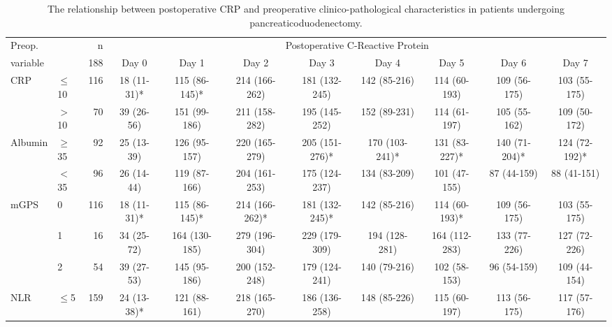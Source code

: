 \begin{sidewaystable}[p]
	\caption{The relationship  between postoperative CRP and preoperative clinico-pathological characteristics in patients undergoing pancreaticoduodenectomy. }
	\label{table:sirs_crp}
	\footnotesize
	\centering
	\renewcommand{\arraystretch}{1.2} %
	\setlength{\tabcolsep}{5pt} %

	\begin{tabular}{|llr | cccccccc|}
		\hline
		Preop.              &          &   n &                                     \multicolumn{8}{c|}{Postoperative C-Reactive Protein}                                      \\
		variable            &          & 188 & Day 0       &     Day 1     &     Day 2      &     Day 3      &     Day 4      &     Day 5     &     Day 6     &     Day 7     \\ \hline
		CRP                 & $\leq$10 & 116 & 18 (11-31)* & 115 (86-145)* & 214 (166-262)  & 181 (132-245)  &  142 (85-216)  & 114 (60-193)  & 109 (56-175)  & 103 (55-175)  \\
		                    & $>$10    &  70 & 39 (26-56)  & 151 (99-186)  & 211 (158-282)  & 195 (145-252)  &  152 (89-231)  & 114 (61-197)  & 105 (55-162)  & 109 (50-172)  \\
		Albumin             & $\geq$35 &  92 & 25 (13-39)  & 126 (95-157)  & 220 (165-279)  & 205 (151-276)* & 170 (103-241)* & 131 (83-227)* & 140 (71-204)* & 124 (72-192)* \\
		                    & $<$35    &  96 & 26 (14-44)  & 119 (87-166)  & 204 (161-253)  & 175 (124-237)  &  134 (83-209)  & 101 (47-155)  &  87 (44-159)  &  88 (41-151)  \\
		mGPS                & 0        & 116 & 18 (11-31)* & 115 (86-145)* & 214 (166-262)* & 181 (132-245)* &  142 (85-216)  & 114 (60-193)* & 109 (56-175)  & 103 (55-175)  \\
		                    & 1        &  16 & 34 (25-72)  & 164 (130-185) & 279 (196-304)  & 229 (179-309)  & 194 (128-281)  & 164 (112-283) & 133 (77-226)  & 127 (72-226)  \\
		                    & 2        &  54 & 39 (27-53)  & 145 (95-186)  & 200 (152-248)  & 179 (124-241)  &  140 (79-216)  & 102 (58-153)  &  96 (54-159)  & 109 (44-154)  \\
		NLR                 & $\leq$5  & 159 & 24 (13-38)* & 121 (88-161)  & 218 (165-270)  & 186 (136-258)  &  148 (85-226)  & 115 (60-197)  & 113 (56-175)  & 117 (57-176)  \\

\end{tabular}
\end{sidewaystable}
